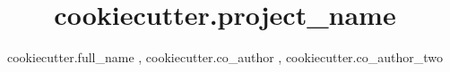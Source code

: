 \title{ {{ cookiecutter.project_name }} }

\author{ {{ cookiecutter.full_name }}, {{ cookiecutter.co_author }}, {{ cookiecutter.co_author_two}} }
\date{}

